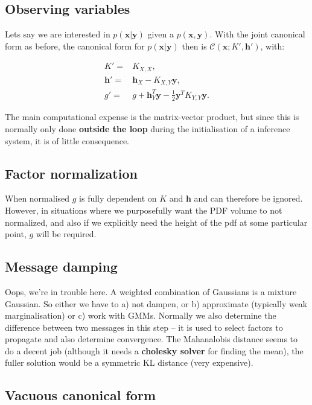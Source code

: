 \subsection{Observing variables}

Lets say we are interested in $p(\mathbf{x}|\mathbf{y})$ given a
$p(\mathbf{x},\mathbf{y})$. With the joint canonical form as before,
the canonical form for $p(\mathbf{x}|\mathbf{y})$ then is $\mathcal{C}(\mathbf{x};K',\mathbf{h}')$,
with:

\begin{align}
K'= & K_{X,X},\label{eq:cfcond_K}\\
\mathbf{h}'= & \mathbf{h}_{X}-K_{X,Y}\mathbf{y},\label{eq:cfcond_h}\\
g'= & g + \mathbf{h}_Y^T\mathbf{y}-\frac{1}{2}\mathbf{y}^T K_{Y,Y}\mathbf{y}.\label{eq:cfcond_g}
\end{align}

The main computational expense is the matrix-vector product, but since
this is normally only done \textbf{outside the loop} during the initialisation
of a inference system, it is of little consequence.


\subsection{Factor normalization}

When normalised $g$ is fully dependent on $ K$ and
$\mathbf{h}$ and can therefore be ignored. However, in situations
where we purposefully want the PDF volume to not normalized, and also
if we explicitly need the height of the pdf at some particular point,
$g$ will be required.


\subsection{Message damping}

Oops, we're in trouble here. A weighted combination of Gaussians is
a mixture Gaussian. So either we have to a) not dampen, or b) approximate
(typically weak marginalisation) or c) work with GMMs. Normally we
also determine the difference between two messages in this step --
it is used to select factors to propagate and also determine convergence.
The Mahanalobis distance seems to do a decent job (although it needs
a \textbf{cholesky solver} for finding the mean), the fuller solution
would be a symmetric KL distance (very expensive).


\subsection{Vacuous canonical form}


